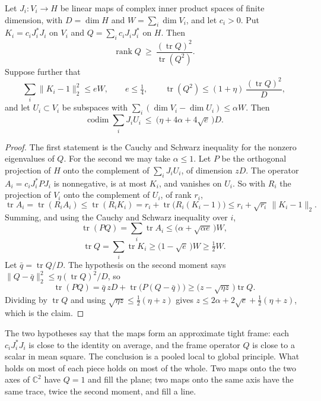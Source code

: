 \begin{lemma}\label{lem:frame}
Let $J_i:V_i\to H$ be linear maps of complex inner product spaces of finite dimension, with $D=\dim H$ and $W=\sum_i\dim V_i$, and let $c_i>0$. Put $K_i=c_iJ_i^*J_i$ on $V_i$ and $Q=\sum_ic_iJ_iJ_i^*$ on $H$. Then
\[
\operatorname{rank}Q\ \ge\ \frac{(\operatorname{tr}Q)^2}{\operatorname{tr}(Q^2)}.
\]
Suppose further that
\[
\sum_i\|K_i-1\|_2^2\le eW,\qquad e\le\tfrac14,\qquad\operatorname{tr}(Q^2)\le(1+\eta)\,\frac{(\operatorname{tr}Q)^2}{D},
\]
and let $U_i\subset V_i$ be subspaces with $\sum_i(\dim V_i-\dim U_i)\le\alpha W$. Then
\[
\operatorname{codim}\sum_iJ_iU_i\ \le\ \big(\eta+4\alpha+4\sqrt e\,\big)D.
\]
\end{lemma}

\begin{proof}
The first statement is the Cauchy and Schwarz inequality for the nonzero eigenvalues of $Q$. For the second we may take $\alpha\le1$. Let $P$ be the orthogonal projection of $H$ onto the complement of $\sum_iJ_iU_i$, of dimension $zD$. The operator $A_i=c_iJ_i^*PJ_i$ is nonnegative, is at most $K_i$, and vanishes on $U_i$. So with $R_i$ the projection of $V_i$ onto the complement of $U_i$, of rank $r_i$,
\[
\operatorname{tr}A_i=\operatorname{tr}(R_iA_i)\le\operatorname{tr}(R_iK_i)=r_i+\operatorname{tr}\big(R_i(K_i-1)\big)\le r_i+\sqrt{r_i}\,\|K_i-1\|_2.
\]
Summing, and using the Cauchy and Schwarz inequality over $i$,
\[
\operatorname{tr}(PQ)=\sum_i\operatorname{tr}A_i\le\big(\alpha+\sqrt{\alpha e}\,\big)W,
\]
\[
\operatorname{tr}Q=\sum_i\operatorname{tr}K_i\ge\big(1-\sqrt e\,\big)W\ge\tfrac12W.
\]
Let $\bar q=\operatorname{tr}Q/D$. The hypothesis on the second moment says $\|Q-\bar q\|_2^2\le\eta(\operatorname{tr}Q)^2/D$, so
\[
\operatorname{tr}(PQ)=\bar q\,zD+\operatorname{tr}\big(P(Q-\bar q)\big)\ge\big(z-\sqrt{\eta z}\,\big)\operatorname{tr}Q.
\]
Dividing by $\operatorname{tr}Q$ and using $\sqrt{\eta z}\le\frac12(\eta+z)$ gives $z\le2\alpha+2\sqrt e+\frac12(\eta+z)$, which is the claim.
\end{proof}

The two hypotheses say that the maps form an approximate tight frame: each $c_iJ_i^*J_i$ is close to the identity on average, and the frame operator $Q$ is close to a scalar in mean square. The conclusion is a pooled local to global principle. What holds on most of each piece holds on most of the whole. Two maps onto the two axes of $\mathbb C^2$ have $Q=1$ and fill the plane; two maps onto the same axis have the same trace, twice the second moment, and fill a line.

